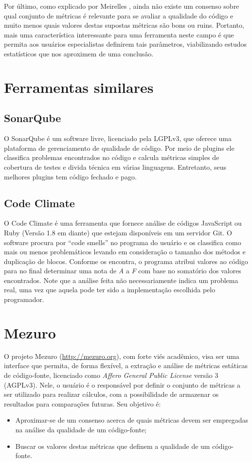 \documentclass[12pt]{article}
\begin{document}
Por último, como explicado por Meirelles \cite{m13}, ainda não existe um consenso sobre qual conjunto de métricas é relevante para se avaliar a qualidade do código e muito menos quais valores destas supostas métricas são bons ou ruins. Portanto, mais uma característica interessante para uma ferramenta neste campo é que permita aos usuários especialistas definirem tais parâmetros, viabilizando estudos estatísticos que nos aproximem de uma conclusão.

\section{Ferramentas similares}
  \subsection{SonarQube}
  O SonarQube é um software livre, licenciado pela LGPLv3, que oferece uma plataforma de gerenciamento de qualidade de código. Por meio de plugins ele classifica problemas encontrados no código e calcula métricas simples de cobertura de testes e divida técnica em várias linguagens. Entretanto, seus melhores plugins tem código fechado e pago.

  \subsection{Code Climate}
  O Code Climate é uma ferramenta que fornece análise de códigos JavaScript ou Ruby (Versão 1.8 em diante) que estejam disponíveis em um servidor Git.
  O software procura por ``code smells'' no programa do usuário e os classifica como mais ou menos problemáticos levando em consideração o tamanho dos métodos e duplicação de blocos. Conforme os encontra, o programa atribui valores ao código para no final determinar uma nota de \textit{A} a \textit{F} com base no somatório dos valores encontrados. Note que a análise feita não necessariamente indica um problema real, uma vez que aquela pode ter sido a implementação escolhida pelo programador.

\section{Mezuro}
O projeto Mezuro (\url{http://mezuro.org}), com forte viés acadêmico, visa ser uma interface que permita, de forma flexível, a extração e análise de métricas estáticas de código-fonte, licenciado como \textit{Affero General Public License} versão 3 (AGPLv3). Nele, o usuário é o responsável por definir o conjunto de métricas a ser utilizado para realizar cálculos, com a possibilidade de armazenar os resultados para comparações futuras. Seu objetivo é:
\begin{itemize}
    \item Aproximar-se de um consenso acerca de quais métricas devem ser empregadas na análise da qualidade de um código-fonte;
    \item Buscar os valores destas métricas que definem a qualidade de um código-fonte.
\end{itemize}
\end{document}
